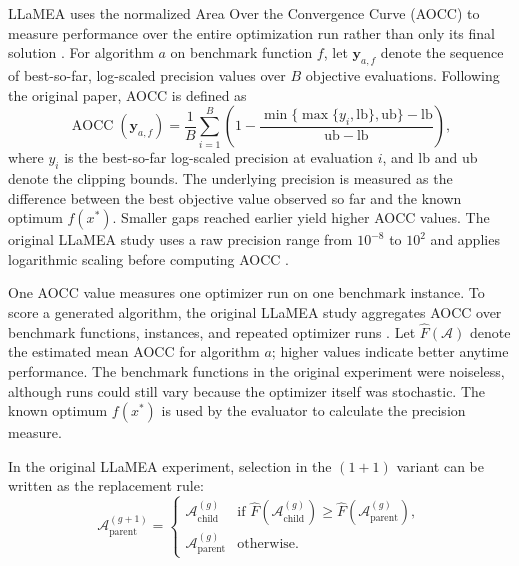 LLaMEA uses the normalized Area Over the Convergence Curve (AOCC)
to measure performance over the entire optimization run rather
than only its final solution \cite{LLaMEA2024}. For algorithm
$a$ on benchmark function $f$, let $\mathbf{y}_{a,f}$ denote
the sequence of best-so-far, log-scaled precision values over
$B$ objective evaluations. Following the original paper,
AOCC is defined as
\begin{equation}
\label{eq:aocc_metric_bg}
    \operatorname{AOCC}(\mathbf{y}_{a,f}) =
    \frac{1}{B}\sum_{i=1}^{B}
    \left(
        1 -
        \frac{
            \min\{\max\{y_i,\mathrm{lb}\},\mathrm{ub}\}
            - \mathrm{lb}
        }{
            \mathrm{ub}-\mathrm{lb}
        }
    \right),
\end{equation}
where $y_i$ is the best-so-far log-scaled precision at
evaluation $i$, and $\mathrm{lb}$ and $\mathrm{ub}$ denote
the clipping bounds. The underlying precision is measured
as the difference between the best objective value observed
so far and the known optimum $f(x^*)$. Smaller gaps reached
earlier yield higher AOCC values. The original LLaMEA study
uses a raw precision range from $10^{-8}$ to $10^2$ and
applies logarithmic scaling before computing AOCC
\cite{LLaMEA2024}.

One AOCC value measures one optimizer run on one benchmark instance. To
score a generated algorithm, the original LLaMEA study aggregates AOCC over
benchmark functions, instances, and repeated optimizer runs
\cite{LLaMEA2024}. Let $\widehat{F}(\mathcal{A})$ denote the estimated mean
AOCC for algorithm $a$; higher values indicate better anytime performance.
The benchmark functions in the original experiment were noiseless, although
runs could still vary because the optimizer itself was stochastic. The known
optimum $f(x^*)$ is used by the evaluator to calculate the precision measure.

In the original LLaMEA experiment, selection in the $(1+1)$ variant can be
written as the replacement rule:
\begin{equation}
\label{eq:one_plus_one_selection}
    \mathcal{A}_{\text{parent}}^{(g+1)} =
    \begin{cases}
        \mathcal{A}_{\text{child}}^{(g)}
        &
        \text{if }
        \widehat{F}(\mathcal{A}_{\text{child}}^{(g)})
        \geq
        \widehat{F}(\mathcal{A}_{\text{parent}}^{(g)}),
        \\
        \mathcal{A}_{\text{parent}}^{(g)}
        &
        \text{otherwise}.
    \end{cases}
\end{equation}

